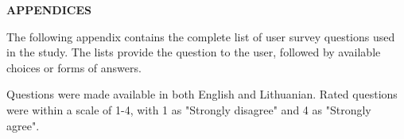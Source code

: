 \appendix

{}
\begin{center}
    \Large \textbf{APPENDICES}
\end{center}
\vspace{1cm}

\label{appendix:survey}
\vspace{0.5em}

The following appendix contains the complete list of user survey questions used in the study. The lists provide the question to the user, followed by available choices or forms of answers.

Questions were made available in both English and Lithuanian. Rated questions were within a scale of 1-4, with 1 as "Strongly disagree" and 4 as "Strongly agree".
